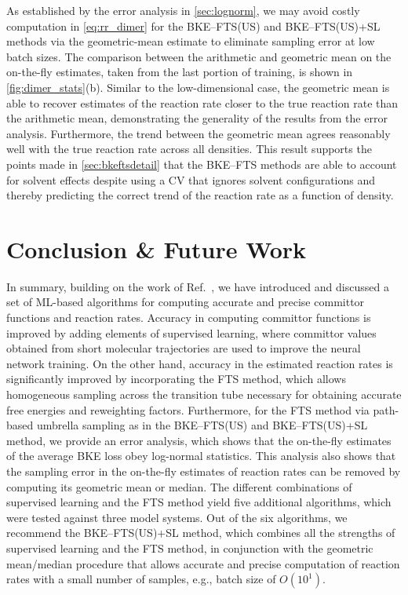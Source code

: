 \documentclass{article}
\numberwithin{equation}{section}
\theoremstyle{definition}
\theoremstyle{remark}
\begin{document}
As established by the error analysis in \cref{sec:lognorm}, we may avoid costly computation in \cref{eq:rr_dimer} for the BKE--FTS(US) and BKE--FTS(US)+SL methods via the geometric-mean estimate to eliminate sampling error at low batch sizes. The comparison between the arithmetic and geometric mean on the on-the-fly estimates, taken from the last portion of training, is shown in \cref{fig:dimer_stats}(b). 
Similar to the low-dimensional case, the geometric mean is able to recover estimates of the reaction rate closer to the true reaction rate than the arithmetic mean, demonstrating the generality of the results from the error analysis. 
Furthermore, the trend between the geometric mean agrees reasonably well with the true reaction rate across all densities. This result supports the points made in \cref{sec:bkeftsdetail} that the BKE--FTS methods are able to account for solvent effects despite using a CV that ignores solvent configurations and thereby predicting the correct trend of the reaction rate as a function of density.

\section{Conclusion \& Future Work}

In summary, building on the work of Ref.~\cite{rotskoff2020learning}, we have introduced and discussed a set of ML-based algorithms for computing accurate and precise committor functions and reaction rates. 
Accuracy in computing committor functions is improved by adding elements of supervised learning, where committor values obtained from short molecular trajectories are used to improve the neural network training. 
On the other hand, accuracy in the estimated reaction rates is significantly improved by incorporating the FTS method, which allows homogeneous sampling across the transition tube necessary for obtaining accurate free energies and reweighting factors. 
Furthermore, for the FTS method via path-based umbrella sampling as in the BKE--FTS(US) and BKE--FTS(US)+SL method, we provide an error analysis, which shows that the on-the-fly estimates of the average BKE loss obey log-normal statistics. 
This analysis also shows that the sampling error in the on-the-fly estimates of reaction rates can be removed by computing its geometric mean or median. 
The different combinations of supervised learning and the FTS method yield five additional algorithms, which were tested against three model systems. 
Out of the six algorithms, we recommend the BKE--FTS(US)+SL method, which combines all the strengths of supervised learning and the FTS method, in conjunction with the geometric mean/median procedure that allows accurate and precise computation of reaction rates with a small number of samples, e.g., batch size of $O(10^1)$.
\end{document}
